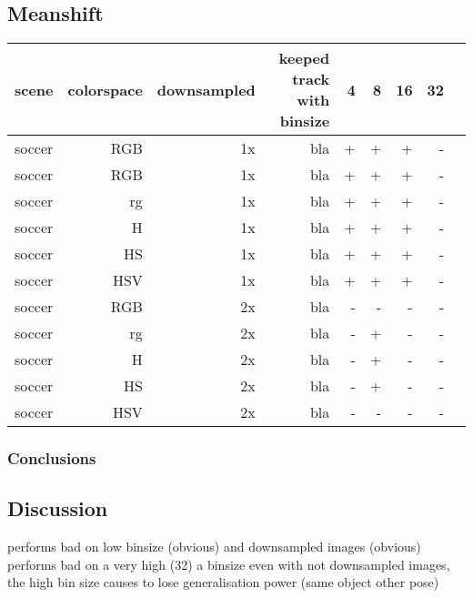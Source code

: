 \documentclass[a4paper,11pt]{article}
\begin{document}
	\subsection{Meanshift} 

	\begin{tabular}{l*{8}{r|}}
		scene	& 	colorspace	& downsampled & keeped track with binsize & 4 & 8 & 16 & 32\\
		\hline
		soccer 	& 	RGB	 		& 1x		  &			bla				  & + & + & +  &  -\\
		soccer 	& 	RGB	 		& 1x		  &			bla				  & + & + & +  &  -\\
		soccer 	& 	rg	 		& 1x 		  &			bla				  & + & + & +  &  -\\
		soccer 	& 	H	 		& 1x		  &			bla				  & + & + & +  &  -\\
		soccer 	& 	HS	 		& 1x		  &			bla				  & + & + & +  &  -\\
		soccer 	& 	HSV	 		& 1x		  &			bla				  & + & + & +  &  -\\
		soccer 	& 	RGB	 		& 2x		  &			bla				  & - & - & -  &  -\\
		soccer 	& 	rg	 		& 2x 		  &			bla				  & - & + & -  &  -\\
		soccer 	& 	H	 		& 2x		  &			bla				  & - & + & -  &  -\\
		soccer 	& 	HS	 		& 2x		  &			bla				  & - & + & -  &  -\\
		soccer 	& 	HSV	 		& 2x		  &			bla				  & - & - & -  &  -\\
	\end{tabular}	

\subsubsection{Conclusions}

\subsection{Discussion} %
performs bad on low binsize (obvious) and downsampled images (obvious)\\

performs bad on a very high (32) a binsize even with not downsampled
images, the high bin size causes to lose generalisation power (same object other pose)\\
		
\end{document}
